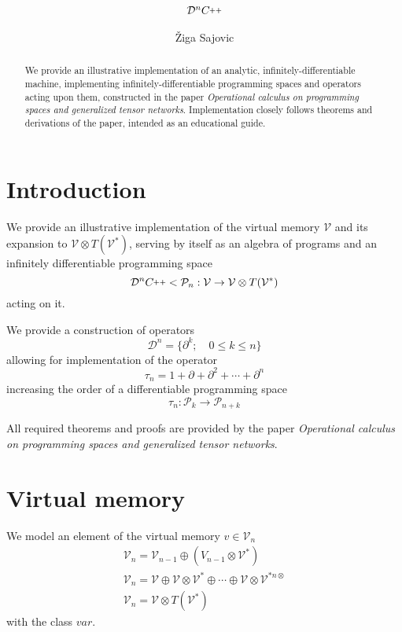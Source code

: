 \documentclass{article}
\title{$\DD^n\CC$}
\author{Žiga Sajovic}
\newcommand{\VV}{\mathcal{V}}
\newcommand{\CC}{C\nolinebreak\hspace{-.05em}\raisebox{.4ex}{\tiny\bf +}\nolinebreak\hspace{-.10em}\raisebox{.4ex}{\tiny\bf +}}
\def\CC{{C\nolinebreak[4]\hspace{-.05em}\raisebox{.4ex}{\tiny\bf ++}}}
\newcommand{\dP}{\mathcal{P}}
\newcommand{\D}{\partial}
\newcommand{\DD}{\mathcal{D}}
\newcommand{\sumd}{\tau}
\begin{document}
\maketitle

\begin{abstract}
We provide an illustrative implementation of an analytic, infinitely-differentiable machine, implementing infinitely-differentiable programming spaces and operators acting upon them, constructed in the paper \emph{Operational calculus on programming spaces and generalized tensor networks}. Implementation closely follows theorems and derivations of the paper, intended as an educational guide.
\end{abstract}

\tableofcontents

\section{Introduction}

We provide an illustrative implementation of the virtual memory $\VV$ and its expansion to $\VV\otimes T(\VV^*)$, serving by itself as an algebra of programs and an infinitely differentiable programming space
\begin{equation}
\DD^n\CC<\dP_n:\VV\to\VV\otimes T(\VV^*)
\end{equation}
acting on it.

We provide a construction of operators
\begin{equation}
\DD^n=\{\D^k;\quad 0\le k\le n\}
\end{equation}
allowing for implementation of the operator
\begin{equation}\label{eq:sumd}
\sumd_n=1+\D+\D^2+\cdots+\D^n
\end{equation}
increasing the order of a differentiable programming space
\begin{equation}
\sumd_n:\dP_k\to\dP_{n+k}
\end{equation}

All required theorems and proofs are provided by the paper \emph{Operational calculus on programming spaces and generalized tensor networks}.

\section{Virtual memory}

We model an element of the virtual memory $v\in\VV_n$ 
\begin{eqnarray}
\VV_{n}=\VV_{n-1}\oplus(V_{n-1}\otimes\VV^*) \\
\VV_{n}=\VV\oplus\VV\otimes\VV^*\oplus\cdots\oplus\VV\otimes\VV^{*n\otimes}\\ \label{eq:V_n}
\VV_n=\VV\otimes T(\VV^*)
\end{eqnarray}
with the class $var$.
\end{document}
